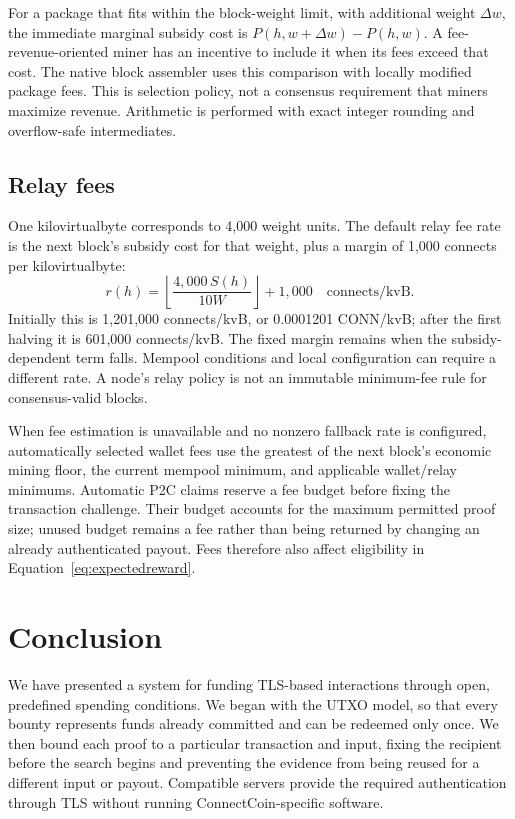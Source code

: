 \documentclass[11pt,a4paper]{article}
\begin{document}
For a package that fits within the block-weight limit, with additional weight
$\Delta w$, the immediate marginal subsidy cost is $P(h,w+\Delta w)-P(h,w)$.
A fee-revenue-oriented miner has an
incentive to include it when its fees exceed that cost. The native block
assembler uses this comparison with locally modified package fees. This is
selection policy, not a consensus requirement that miners maximize revenue.
Arithmetic is performed with exact integer rounding and overflow-safe
intermediates.

\subsection*{Relay fees}

One kilovirtualbyte corresponds to 4,000 weight units. The default relay fee
rate is the next block's subsidy cost for that weight, plus a margin of
1,000 connects per kilovirtualbyte:
\begin{equation}
 r(h)=\left\lfloor\frac{4{,}000\,S(h)}{10W}\right\rfloor+1{,}000
 \quad\text{connects/kvB}.
 \label{eq:relay}
\end{equation}
Initially this is 1,201,000 connects/kvB, or 0.0001201 CONN/kvB; after the first
halving it is 601,000 connects/kvB. The fixed margin remains when the
subsidy-dependent term falls. Mempool conditions and local configuration can
require a different rate. A node's relay policy is not an immutable
minimum-fee rule for consensus-valid blocks.

When fee estimation is unavailable and no nonzero fallback rate is configured,
automatically selected wallet fees use the greatest of the next block's economic
mining floor, the current mempool minimum, and applicable wallet/relay minimums.
Automatic P2C claims reserve a fee budget before fixing the
transaction challenge. Their budget accounts for the maximum permitted proof
size; unused budget remains a fee rather than being returned by changing an
already authenticated payout. Fees therefore also affect eligibility in
Equation~\eqref{eq:expectedreward}.

\clearpage
\section{Conclusion}

We have presented a system for funding TLS-based interactions through open,
predefined spending conditions. We began with the UTXO model, so that every
bounty represents funds already committed and can be redeemed only once.
We then bound each proof to a particular transaction and input, fixing the
recipient before the search begins and preventing the evidence from being
reused for a different input or payout. Compatible servers provide the
required authentication through TLS without running ConnectCoin-specific
software.
\end{document}
